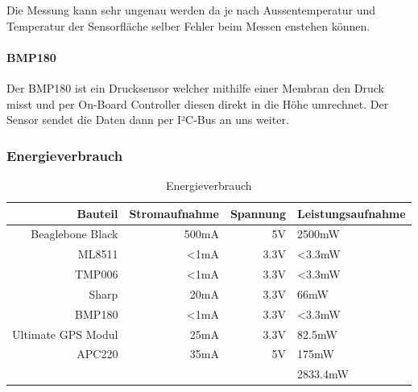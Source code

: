 Die Messung kann sehr ungenau werden da je nach Aussentemperatur und Temperatur der Sensorfläche selber Fehler beim Messen enstehen können.

\paragraph{BMP180}
Der BMP180 ist ein Drucksensor welcher mithilfe einer Membran den Druck misst und per On-Board Controller diesen direkt in die Höhe umrechnet. Der Sensor sendet die Daten dann per I²C-Bus an uns weiter.

\subsubsection{Energieverbrauch}
\begin{table}[H]
  \centering
    \begin{tabular}{rrrl}
    \toprule
    \textbf{Bauteil} & \textbf{Stromaufnahme} & \textbf{Spannung} & \textbf{Leistungsaufnahme} \\
    \midrule
    Beaglebone Black  & 500mA & 5V & 2500mW \\
    ML8511& <1mA & 3.3V & <3.3mW \\
    TMP006& <1mA& 3.3V& <3.3mW \\
    Sharp& 20mA & 3.3V& 66mW\\
    BMP180& <1mA& 3.3V& <3.3mW \\
    Ultimate GPS Modul& 25mA&3.3V& 82.5mW \\
    APC220& 35mA & 5V & 175mW\\

    \bottomrule
     & & &2833.4mW \\
    \bottomrule
    \end{tabular}%
    \caption{Energieverbrauch}
  \label{tab:budgetausgaben}%
\end{table}%
